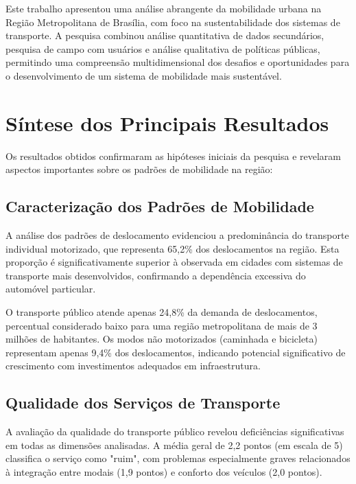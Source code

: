 

Este trabalho apresentou uma análise abrangente da mobilidade urbana na Região Metropolitana de Brasília, com foco na sustentabilidade dos sistemas de transporte. A pesquisa combinou análise quantitativa de dados secundários, pesquisa de campo com usuários e análise qualitativa de políticas públicas, permitindo uma compreensão multidimensional dos desafios e oportunidades para o desenvolvimento de um sistema de mobilidade mais sustentável.

\section{Síntese dos Principais Resultados}

Os resultados obtidos confirmaram as hipóteses iniciais da pesquisa e revelaram aspectos importantes sobre os padrões de mobilidade na região:

\subsection{Caracterização dos Padrões de Mobilidade}

A análise dos padrões de deslocamento evidenciou a predominância do transporte individual motorizado, que representa 65,2\% dos deslocamentos na região. Esta proporção é significativamente superior à observada em cidades com sistemas de transporte mais desenvolvidos, confirmando a dependência excessiva do automóvel particular.

O transporte público atende apenas 24,8\% da demanda de deslocamentos, percentual considerado baixo para uma região metropolitana de mais de 3 milhões de habitantes. Os modos não motorizados (caminhada e bicicleta) representam apenas 9,4\% dos deslocamentos, indicando potencial significativo de crescimento com investimentos adequados em infraestrutura.

\subsection{Qualidade dos Serviços de Transporte}

A avaliação da qualidade do transporte público revelou deficiências significativas em todas as dimensões analisadas. A média geral de 2,2 pontos (em escala de 5) classifica o serviço como "ruim", com problemas especialmente graves relacionados à integração entre modais (1,9 pontos) e conforto dos veículos (2,0 pontos).


